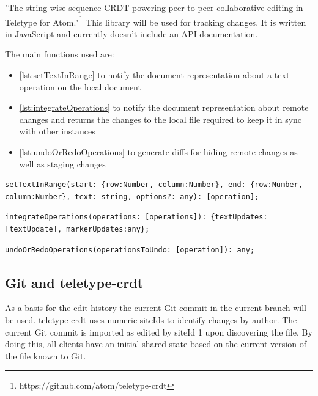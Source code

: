 "The string-wise sequence CRDT powering peer-to-peer collaborative editing in Teletype for Atom."\footnote{https://github.com/atom/teletype-crdt}
This library will be used for tracking changes. It is written in JavaScript and currently doesn't include an API documentation.

The main functions used are: 

\begin{itemize}
    \item \ref{lst:setTextInRange} to notify the document representation about a text operation on the local document
    \item \ref{lst:integrateOperations} to notify the document representation about remote changes and returns the changes to the local file required to keep it in sync with other instances
    \item \ref{lst:undoOrRedoOperations} to generate diffs for hiding remote changes as well as staging changes
\end{itemize}


\begin{lstlisting}[label={lst:setTextInRange}, caption=VS Code API setTextInRange]
setTextInRange(start: {row:Number, column:Number}, end: {row:Number, column:Number}, text: string, options?: any): [operation];
\end{lstlisting}

\begin{lstlisting}[label={lst:integrateOperations}, caption=VS Code API integrateOperations]
integrateOperations(operations: [operations]): {textUpdates:[textUpdate], markerUpdates:any};
\end{lstlisting}

\begin{lstlisting}[label={lst:undoOrRedoOperations}, caption=VS Code API undoOrRedoOperations]
undoOrRedoOperations(operationsToUndo: [operation]): any;
\end{lstlisting}

\subsection{Git and teletype-crdt}
As a basis for the edit history  the current Git commit in the current branch will be used. teletype-crdt uses numeric siteIds to identify changes by author. The current Git commit is imported as edited by siteId 1 upon discovering the file. By doing this, all clients have an initial shared state based on the current version of the file known to Git.

